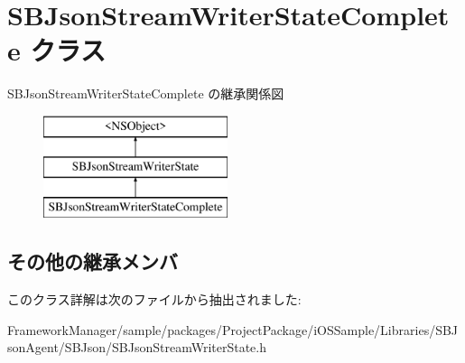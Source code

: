 \hypertarget{interface_s_b_json_stream_writer_state_complete}{}\section{S\+B\+Json\+Stream\+Writer\+State\+Complete クラス}
\label{interface_s_b_json_stream_writer_state_complete}
S\+B\+Json\+Stream\+Writer\+State\+Complete の継承関係図\begin{figure}[H]
\begin{center}
\leavevmode
\includegraphics[height=3.000000cm]{interface_s_b_json_stream_writer_state_complete}
\end{center}
\end{figure}
\subsection*{その他の継承メンバ}


このクラス詳解は次のファイルから抽出されました\+:\begin{DoxyCompactItemize}
\item 
Framework\+Manager/sample/packages/\+Project\+Package/i\+O\+S\+Sample/\+Libraries/\+S\+B\+Json\+Agent/\+S\+B\+Json/S\+B\+Json\+Stream\+Writer\+State.\+h\end{DoxyCompactItemize}
